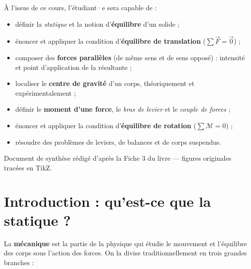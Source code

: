 \documentclass[11pt,a4paper]{article}
\newcommand{\vv}[1]{\vec{#1}}
\newcommand{\Mom}{\mathcal{M}}      %
\begin{document}
\begin{tcolorbox}[boxbase,colback=primary!5,colframe=primary,width=15cm,
    title={\textsc{Objectifs pédagogiques de la fiche}}]
À l'issue de ce cours, l'étudiant·e sera capable de :
\begin{itemize}[leftmargin=1.6em,topsep=2pt,itemsep=1pt]
  \item définir la \emph{statique} et la notion d'\textbf{équilibre} d'un solide ;
  \item énoncer et appliquer la condition d'\textbf{équilibre de translation} ($\sum \vv F = \vv 0$) ;
  \item composer des \textbf{forces parallèles} (de même sens et de sens opposé) : intensité et point d'application de la résultante ;
  \item localiser le \textbf{centre de gravité} d'un corps, théoriquement et expérimentalement ;
  \item définir le \textbf{moment d'une force}, le \emph{bras de levier} et le \emph{couple de forces} ;
  \item énoncer et appliquer la condition d'\textbf{équilibre de rotation} ($\sum \Mom = 0$) ;
  \item résoudre des problèmes de leviers, de balances et de corps suspendus.
\end{itemize}
\end{tcolorbox}

\vspace{0.6cm}
{\small\color{black!60} Document de synthèse rédigé d'après la Fiche 3 du livre — figures originales tracées en TikZ.}
\par
\endgroup

\newpage
\renewcommand{\contentsname}{\textcolor{primarydark}{Table des matières}}
\tableofcontents
\thispagestyle{fancy}
\newpage

\section{Introduction : qu'est-ce que la statique ?}
La \textbf{mécanique} est la partie de la physique qui étudie le mouvement et l'équilibre
des corps sous l'action des forces. On la divise traditionnellement en trois grandes branches :
\end{document}
